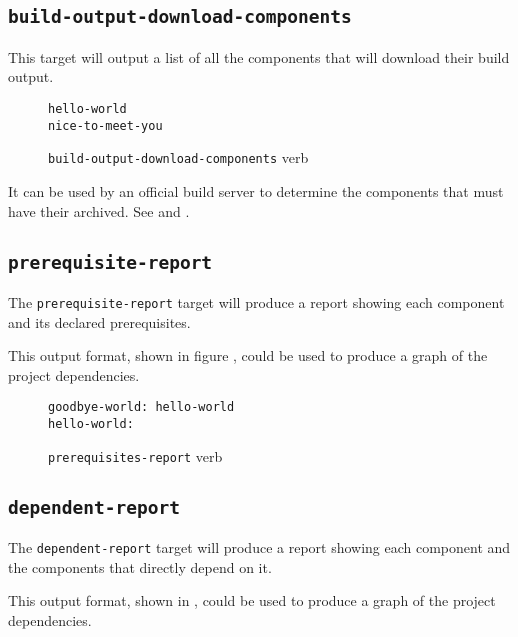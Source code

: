 \subsection{\texttt{build-output-download-components}}
\label{build-output-download-components}

This target will output a list of all the components that will
download their build output.

\begin{figure}[tbh]
\hrulefill
\begin{verbatim}
hello-world
nice-to-meet-you
\end{verbatim}
\hrulefill
\caption{\texttt{build-output-download-components} verb}
\label{usinglmsbw:{build-output-download-components-verb}}
\end{figure}

It can be used by an official build server to determine the components
that must have their \destdir archived.  See
 and
.

\subsection{\texttt{prerequisite-report}}
\label{usinglmsbw:prerequisite-report}

  The \texttt{prerequisite-report} target will produce a report showing
  each component and its declared prerequisites.

This output format, shown in figure
, could be used to produce a
graph of the project dependencies.

\begin{figure}[tbh]
\hrulefill
\begin{verbatim}
goodbye-world: hello-world
hello-world:
\end{verbatim}
\hrulefill
\caption{\texttt{prerequisites-report} verb}\label{usinglmsbw:prerequisites-verb}
\end{figure}


\subsection{\texttt{dependent-report}}\label{usinglmsbw:dependent-report}

The \texttt{dependent-report} target will produce a report showing
each component and the components that directly depend on it.

This output format, shown in ,
could be used to produce a graph of the project dependencies.

